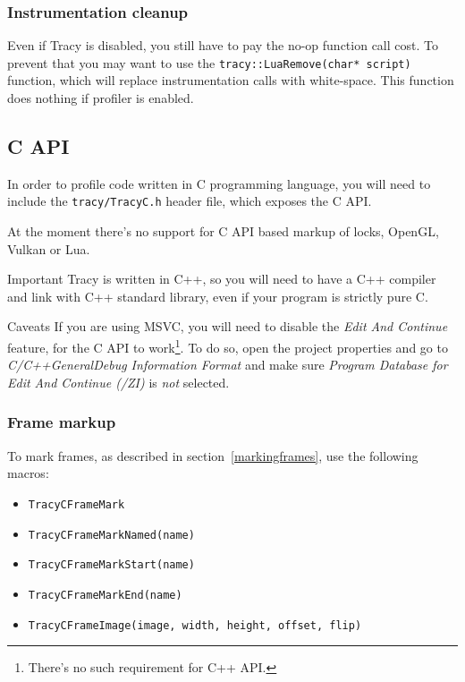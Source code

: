 \documentclass[hidelinks,titlepage,a4paper]{article}
\begin{document}
\subsubsection{Instrumentation cleanup}

Even if Tracy is disabled, you still have to pay the no-op function call cost. To prevent that you may want to use the \texttt{tracy::LuaRemove(char* script)} function, which will replace instrumentation calls with white-space. This function does nothing if profiler is enabled.

\subsection{C API}
\label{capi}

In order to profile code written in C programming language, you will need to include the \texttt{tracy/TracyC.h} header file, which exposes the C API.

At the moment there's no support for C API based markup of locks, OpenGL, Vulkan or Lua.

\begin{bclogo}[
noborder=true,
couleur=black!5,
logo=\bcbombe
]{Important}
Tracy is written in C++, so you will need to have a C++ compiler and link with C++ standard library, even if your program is strictly pure C.
\end{bclogo}

\begin{bclogo}[
noborder=true,
couleur=black!5,
logo=\bcattention
]{Caveats}
If you are using MSVC, you will need to disable the \emph{Edit And Continue} feature, for the C API to work\footnote{There's no such requirement for C++ API.}. To do so, open the project properties and go to \emph{C/C++\textrightarrow General\textrightarrow Debug Information Format} and make sure \emph{Program Database for Edit And Continue (/ZI)} is \emph{not} selected.
\end{bclogo}

\subsubsection{Frame markup}

To mark frames, as described in section~\ref{markingframes}, use the following macros:

\begin{itemize}
\item \texttt{TracyCFrameMark}
\item \texttt{TracyCFrameMarkNamed(name)}
\item \texttt{TracyCFrameMarkStart(name)}
\item \texttt{TracyCFrameMarkEnd(name)}
\item \texttt{TracyCFrameImage(image, width, height, offset, flip)}
\end{itemize}
\end{document}
